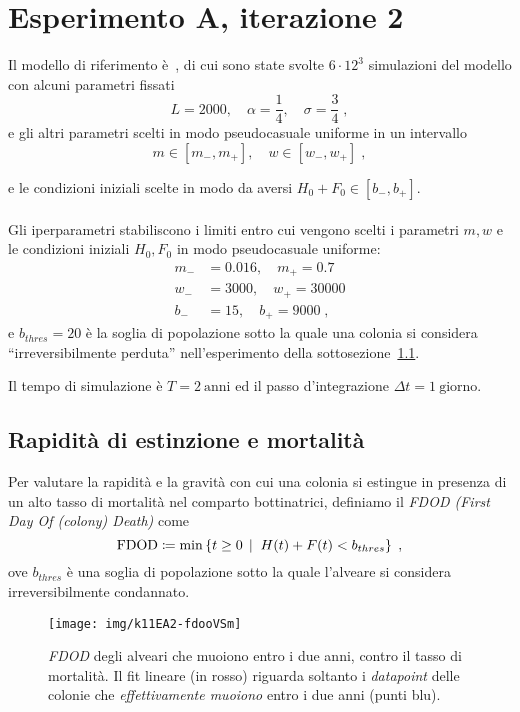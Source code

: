 \section{Esperimento A, iterazione 2}
Il modello di riferimento è~\cite{khoury2011}, di cui sono state svolte $6 \cdot 12^{3}$ simulazioni del
modello con alcuni parametri fissati
$$L = 2000, \quad \alpha = \frac{1}{4}, \quad \sigma = \frac{3}{4} \; ,$$
e gli altri parametri scelti in modo pseudocasuale uniforme in un intervallo
$$m \in \left[ m_-, m_+ \right], \quad w \in \left[ w_-, w_+ \right] \; ,$$

e le condizioni iniziali scelte in modo da aversi $H_0+F_0 \in \left[ b_-, b_+ \right]$.

\paragraph{}
Gli iperparametri stabiliscono i limiti entro cui vengono scelti i parametri $m, w$ e le condizioni iniziali $H_0, F_0$
in modo pseudocasuale uniforme:
\begin{equation*}
\begin{split}
m_- &= 0.016, \quad m_+ = 0.7 \\
w_- &= 3000, \quad w_+ = 30000 \\
b_- &= 15, \quad b_+ = 9000 \; ,
\end{split}
\end{equation*}
e $b_{thres} = 20$ è la soglia di popolazione sotto la quale una colonia si considera ``irreversibilmente perduta''
nell'esperimento della sottosezione~\ref{sec:fdod}.

Il tempo di simulazione è $T=2~\text{anni}$ ed il passo d'integrazione $\Delta t = 1~\text{giorno}$.

\subsection{Rapidità di estinzione e mortalità}
\label{sec:fdod}
Per valutare la rapidità e la gravità con cui una colonia si estingue in presenza di un alto tasso di
mortalità nel comparto bottinatrici, definiamo il \emph{FDOD (First Day Of (colony) Death)} come
$$\text{FDOD} \coloneq \min \left\{ t \geq 0 \,\mid\; H(t) + F(t) < b_{thres} \right\} \; ,$$
ove $b_{thres}$ è una soglia di popolazione sotto la quale l'alveare si considera
irreversibilmente condannato.
\begin{figure}[hbt]
    \centering
    \texttt{[image: img/k11EA2-fdooVSm]}

    \caption[Esperimento A2, \emph{FDOD} vs. mortalità.]{\emph{FDOD} degli alveari che muoiono entro i due anni,
        contro il tasso di mortalità. Il fit lineare (in rosso) riguarda soltanto i \emph{datapoint}
        delle colonie che \emph{effettivamente muoiono} entro i due anni (punti blu).}

    \label{img:kh11expA21}
\end{figure}

